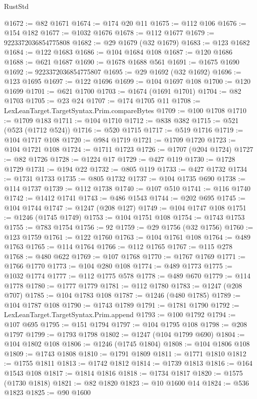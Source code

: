 \begin{lexlean}{RustStd}
\begin{coremodule}
{\begin{coremodule}
{{{{{{{{{{{{{{{{{{{{{{{{{{{{{{{{{{{{{{{{{{{{{{{{{{{{{{{@1672 := @82 @1671
@1674 := @174 @20 @11
@1675 := @112 @106
@1676 := @154 @182
@1677 := @1032 @1676
@1678 := @112 @1677
@1679 := 9223372036854775808
@1682 := @29 @1679 (@32 @1679)
@1683 := @123 @1682
@1684 := @122 @1683
@1686 := @104 @1684 @108
@1687 := @120 @1686
@1688 := @621 @1687
@1690 := @1678 @1688 @561
@1691 := @1675 @1690
@1692 := 9223372036854775807
@1695 := @29 @1692 (@32 @1692)
@1696 := @123 @1695
@1697 := @122 @1696
@1699 := @104 @1697 @108
@1700 := @120 @1699
@1701 := @621 @1700
@1703 := @1674 (@1691 @1701)
@1704 := @82 @1703
@1705 := @23 @24
@1707 := @174 @1705 @11
@1708 := LexLeanTarget.TargetSyntax.Prim.compareBytes
@1709 := @100 @1708
@1710 := @1709 @183
@1711 := @104 @1710
@1712 := @838 @382
@1715 := @521 (@523 (@1712 @524))
@1716 := @520 @1715
@1717 := @519 @1716
@1719 := @104 @1717 @108
@1720 := @984 @1719
@1721 := @1709 @1720
@1723 := @104 @1721 @108
@1724 := @1711 @1723
@1726 := @1707 (@204 @1724)
@1727 := @82 @1726
@1728 := @1224 @17
@1729 := @427 @119
@1730 := @1728 @1729
@1731 := @194 @22
@1732 := @805 @119
@1733 := @427 @1732
@1734 := @1731 @1733
@1735 := @805 @1732
@1737 := @104 @1735 @690
@1738 := @114 @1737
@1739 := @112 @1738
@1740 := @107 @510
@1741 := @116 @1740
@1742 := @1412 @1741
@1743 := @486 @1543
@1744 := @202 @695
@1745 := @104 @1744
@1747 := @1247 (@208 @127)
@1749 := @104 @1747 @108
@1751 := @1246 (@1745 @1749)
@1753 := @104 @1751 @108
@1754 := @1743 @1753
@1755 := @783 @1754
@1756 := 92
@1759 := @29 @1756 (@32 @1756)
@1760 := @123 @1759
@1761 := @122 @1760
@1763 := @104 @1761 @108
@1764 := @489 @1763
@1765 := @114 @1764
@1766 := @112 @1765
@1767 := @115 @278
@1768 := @480 @622
@1769 := @107 @1768
@1770 := @1767 @1769
@1771 := @1766 @1770
@1773 := @104 @280 @108
@1774 := @489 @1773
@1775 := @1032 @1774
@1777 := @112 @1775 @578
@1778 := @489 @670
@1779 := @114 @1778
@1780 := @1777 @1779
@1781 := @112 @1780
@1783 := @1247 (@208 @707)
@1785 := @104 @1783 @108
@1787 := @1246 (@480 @1785)
@1789 := @104 @1787 @108
@1790 := @1743 @1789
@1791 := @1781 @1790
@1792 := LexLeanTarget.TargetSyntax.Prim.append
@1793 := @100 @1792
@1794 := @107 @695
@1795 := @151 @1794
@1797 := @104 @1795 @108
@1798 := @208 @1797
@1799 := @1793 @1798
@1802 := @1247 (@104 @1799 @690)
@1804 := @104 @1802 @108
@1806 := @1246 (@1745 @1804)
@1808 := @104 @1806 @108
@1809 := @1743 @1808
@1810 := @1791 @1809
@1811 := @1771 @1810
@1812 := @1755 @1811
@1813 := @1742 @1812
@1814 := @1739 @1813
@1816 := @164 @1543 @108
@1817 := @1814 @1816
@1818 := @1734 @1817
@1820 := @1575 (@1730 @1818)
@1821 := @82 @1820
@1823 := @10 @1600 @14
@1824 := @536 @1823
@1825 := @90 @1600
}}}}}}}}}}}}}}}}}}}}}}}}}}}}}}}}}}}}}}}}}}}}}}}}}}}}}}}
\end{coremodule}}
\end{coremodule}
\end{lexlean}
